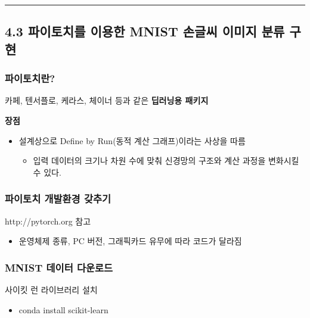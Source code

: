 \documentclass[]{article}
\begin{document}
\begin{center}\rule{0.5\linewidth}{\linethickness}\end{center}

\hypertarget{header-n118}{%
\subsection{4.3 파이토치를 이용한 MNIST 손글씨 이미지 분류
구현}\label{header-n118}}

\hypertarget{header-n119}{%
\subsubsection{파이토치란?}\label{header-n119}}

카페, 텐서플로, 케라스, 체이너 등과 같은 \textbf{딥러닝용 패키지}

\textbf{장점}

\begin{itemize}
\item
  설계상으로 Define by Run(동적 계산 그래프)이라는 사상을 따름

  \begin{itemize}
  \item
    입력 데이터의 크기나 차원 수에 맞춰 신경망의 구조와 계산 과정을
    변화시킬 수 있다.
  \end{itemize}
\end{itemize}

\hypertarget{header-n129}{%
\subsubsection{파이토치 개발환경 갖추기}\label{header-n129}}

http://pytorch.org 참고

\begin{itemize}
\item
  운영체제 종류, PC 버전, 그래픽카드 유무에 따라 코드가 달라짐
\end{itemize}

\hypertarget{header-n134}{%
\subsubsection{MNIST 데이터 다운로드}\label{header-n134}}

사이킷 런 라이브러리 설치

\begin{itemize}
\item
  conda install scikit-learn
\end{itemize}
\end{document}
